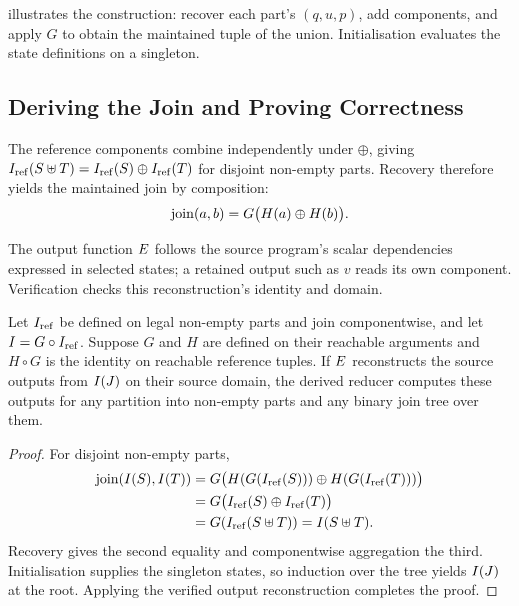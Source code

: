  illustrates the construction: recover each part's $(q,u,p)$, add components, and apply $G$ to obtain the maintained tuple of the union.
Initialisation evaluates the state definitions on a singleton.
\finishwrapspace

\subsection{Deriving the Join and Proving Correctness}
\label{sec:correctness}

The reference components combine independently under $\oplus$, giving
$I_{\mathrm{ref}}(S\uplus T)=I_{\mathrm{ref}}(S)\oplus I_{\mathrm{ref}}(T)$ for disjoint non-empty parts.
Recovery therefore yields the maintained join by composition:
\begin{equation}
\label{eq:merge}
\operatorname{join}(a,b)=G\bigl(H(a)\oplus H(b)\bigr).
\end{equation}

The output function $E$ follows the source program's scalar dependencies expressed in selected states; a retained output such as $v$ reads its own component.
Verification checks this reconstruction's identity and domain.

\begin{theorem}
\label{thm:correct}
Let $I_{\mathrm{ref}}$ be defined on legal non-empty parts and join componentwise, and let $I=G\circ I_{\mathrm{ref}}$.
Suppose $G$ and $H$ are defined on their reachable arguments and $H\circ G$ is the identity on reachable reference tuples.
If $E$ reconstructs the source outputs from $I(J)$ on their source domain, the derived reducer computes these outputs for any partition into non-empty parts and any binary join tree over them.
\end{theorem}
\begin{proof}
For disjoint non-empty parts,
\[
\begin{aligned}
\operatorname{join}(I(S),I(T))
 &=G\bigl(H(G(I_{\mathrm{ref}}(S)))\oplus H(G(I_{\mathrm{ref}}(T)))\bigr)\\
 &=G\bigl(I_{\mathrm{ref}}(S)\oplus I_{\mathrm{ref}}(T)\bigr)\\
 &=G(I_{\mathrm{ref}}(S\uplus T))=I(S\uplus T).
\end{aligned}
\]
Recovery gives the second equality and componentwise aggregation the third.
Initialisation supplies the singleton states, so induction over the tree yields $I(J)$ at the root.
Applying the verified output reconstruction completes the proof.
\end{proof}

